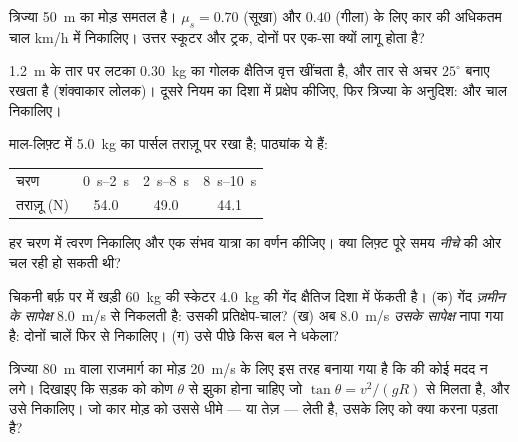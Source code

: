 \begin{exercise}[$\star\star$]\label{exo:g12:newtons-laws:9}
त्रिज्या \qty{50}{m} का मोड़ समतल है। $\mu_s = 0.70$ (सूखा) और $0.40$ (गीला) के लिए कार
की अधिकतम चाल \unit{km/h} में निकालिए। उत्तर स्कूटर और ट्रक, दोनों पर एक-सा क्यों
लागू होता है?
\end{exercise}

\begin{exercise}[$\star\star$]\label{exo:g12:newtons-laws:10}
\qty{1.2}{m} के तार पर लटका \qty{0.30}{kg} का गोलक क्षैतिज वृत्त खींचता है, और तार
 से अचर $25^\circ$ बनाए रखता है (शंक्वाकार लोलक)। दूसरे नियम का
 दिशा में प्रक्षेप कीजिए, फिर त्रिज्या के अनुदिश:
 और चाल निकालिए।
\end{exercise}

\begin{exercise}[$\star\star$]\label{exo:g12:newtons-laws:11}
माल-लिफ़्ट में \qty{5.0}{kg} का पार्सल तराज़ू पर रखा है; पाठ्यांक ये हैं:
\begin{center}\small\begin{tabular}{lccc}
चरण & \qtyrange{0}{2}{s} & \qtyrange{2}{8}{s} & \qtyrange{8}{10}{s}\\
तराज़ू (\unit{N}) & 54.0 & 49.0 & 44.1
\end{tabular}\end{center}
हर चरण में त्वरण निकालिए और एक संभव यात्रा का वर्णन कीजिए। क्या लिफ़्ट पूरे
समय \emph{नीचे} की ओर चल रही हो सकती थी?
\end{exercise}

\begin{exercise}[$\star\star\star$]\label{exo:g12:newtons-laws:12}
चिकनी बर्फ़ पर  में खड़ी \qty{60}{kg} की स्केटर \qty{4.0}{kg} की गेंद क्षैतिज दिशा
में फेंकती है। (क) गेंद \emph{ज़मीन के सापेक्ष} \qty{8.0}{m/s} से निकलती है: उसकी
प्रतिक्षेप-चाल? (ख) अब \qty{8.0}{m/s} \emph{उसके सापेक्ष} नापा गया है: दोनों चालें
फिर से निकालिए। (ग) उसे पीछे किस बल ने धकेला?
\end{exercise}

\begin{exercise}[$\star\star\star$]\label{exo:g12:newtons-laws:13}
त्रिज्या \qty{80}{m} वाला राजमार्ग का मोड़ \qty{20}{m/s} के लिए इस तरह बनाया गया है कि
 की कोई मदद न लगे। दिखाइए कि सड़क को कोण $\theta$ से झुका होना
चाहिए जो $\tan\theta = v^2/(gR)$ से मिलता है, और उसे निकालिए। जो कार मोड़ को उससे धीमे --- या
तेज़ --- लेती है, उसके लिए  को क्या करना पड़ता है?
\end{exercise}

